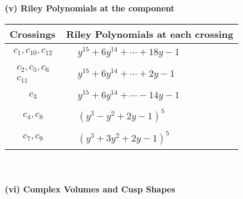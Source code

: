 \documentclass[1p]{elsarticle_modified}
\theoremstyle{definition}
\begin{document}
\newpage\renewcommand{\arraystretch}{1}
\flushleft \textbf{(v) Riley Polynomials at the component}\newline \\
\begin{tabular}{m{50pt}|m{274pt}}
Crossings & \hspace{64pt}Riley Polynomials at each crossing \\
\hline $$\begin{aligned}c_{1},c_{10},c_{12}\end{aligned}$$&$\begin{aligned}
&y^{15}+6 y^{14}+\cdots+18 y-1
\end{aligned}$\\
\hline $$\begin{aligned}c_{2},c_{5},c_{6}\\c_{11}\end{aligned}$$&$\begin{aligned}
&y^{15}+6 y^{14}+\cdots+2 y-1
\end{aligned}$\\
\hline $$\begin{aligned}c_{3}\end{aligned}$$&$\begin{aligned}
&y^{15}+6 y^{14}+\cdots-14 y-1
\end{aligned}$\\
\hline $$\begin{aligned}c_{4},c_{8}\end{aligned}$$&$\begin{aligned}
&(y^3- y^2+2 y-1)^5
\end{aligned}$\\
\hline $$\begin{aligned}c_{7},c_{9}\end{aligned}$$&$\begin{aligned}
&(y^3+3 y^2+2 y-1)^5
\end{aligned}$\\
\hline
\end{tabular}\\~\\
\newpage\flushleft \textbf{(vi) Complex Volumes and Cusp Shapes}
\end{document}
